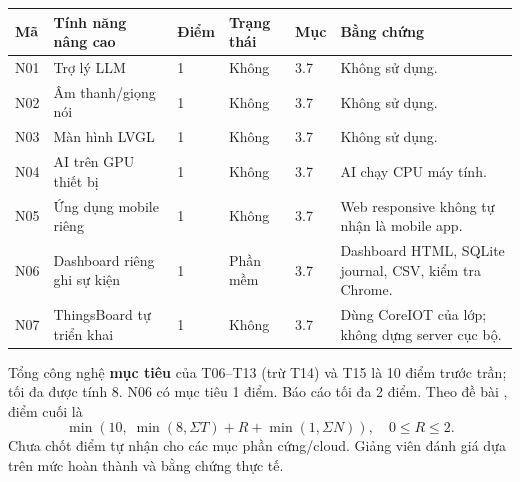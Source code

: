 \documentclass[12pt,a4paper,oneside]{report}
\begin{document}
\begin{longtable}{P{.8cm}P{4.6cm}P{.95cm}P{2cm}P{1.2cm}P{3.75cm}}
\toprule Mã & Tính năng nâng cao & Điểm & Trạng thái & Mục & Bằng chứng \\ \midrule
N01 & Trợ lý LLM & 1 & Không & 3.7 & Không sử dụng. \\
N02 & Âm thanh/giọng nói & 1 & Không & 3.7 & Không sử dụng. \\
N03 & Màn hình LVGL & 1 & Không & 3.7 & Không sử dụng. \\
N04 & AI trên GPU thiết bị & 1 & Không & 3.7 & AI chạy CPU máy tính. \\
N05 & Ứng dụng mobile riêng & 1 & Không & 3.7 & Web responsive không tự nhận là mobile app. \\
N06 & Dashboard riêng ghi sự kiện & 1 & Phần mềm & 3.7 & Dashboard HTML, SQLite journal, CSV, kiểm tra Chrome. \\
N07 & ThingsBoard tự triển khai & 1 & Không & 3.7 & Dùng CoreIOT của lớp; không dựng server cục bộ. \\
\bottomrule
\end{longtable}
\normalsize
Tổng công nghệ \textbf{mục tiêu} của T06--T13 (trừ T14) và T15 là 10 điểm trước trần; tối đa được tính 8. N06 có mục tiêu 1 điểm. Báo cáo tối đa 2 điểm. Theo đề bài \cite{assignment}, điểm cuối là
\[
\min\!\left(10,\;\min(8,\Sigma T)+R+\min(1,\Sigma N)\right),\quad 0\leq R\leq2.
\]
Chưa chốt điểm tự nhận cho các mục phần cứng/cloud. Giảng viên đánh giá dựa trên mức hoàn thành và bằng chứng thực tế.

\tableofcontents
\listoffigures
\listoftables
\end{document}
